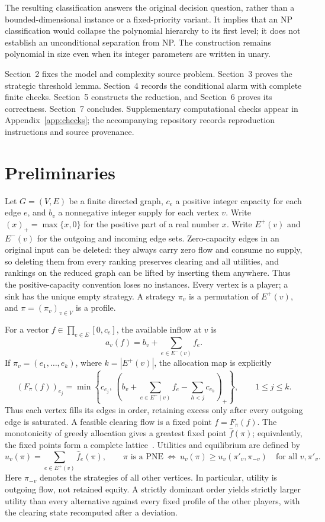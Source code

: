 \documentclass[11pt]{article}
\newcommand{\pne}{\mathrm{PNE}}
\newcommand{\pos}[1]{(#1)_+}
\begin{document}
The resulting classification answers the original decision question, rather than a bounded-dimensional instance or a fixed-priority variant. It implies that an NP classification would collapse the polynomial hierarchy to its first level; it does not establish an unconditional separation from NP. The construction remains polynomial in size even when its integer parameters are written in unary.

Section~2 fixes the model and complexity source problem. Section~3 proves the strategic threshold lemma. Section~4 records the conditional alarm with complete finite checks. Section~5 constructs the reduction, and Section~6 proves its correctness. Section~7 concludes. Supplementary computational checks appear in Appendix~\ref{app:checks}; the accompanying repository records reproduction instructions and source provenance.

\section{Preliminaries}
Let $G=(V,E)$ be a finite directed graph, $c_e$ a positive integer capacity for each edge $e$, and $b_v$ a nonnegative integer supply for each vertex $v$. Write $\pos{x}=\max\{x,0\}$ for the positive part of a real number $x$. Write $E^+(v)$ and $E^-(v)$ for the outgoing and incoming edge sets. Zero-capacity edges in an original input can be deleted: they always carry zero flow and consume no supply, so deleting them from every ranking preserves clearing and all utilities, and rankings on the reduced graph can be lifted by inserting them anywhere. Thus the positive-capacity convention loses no instances. Every vertex is a player; a sink has the unique empty strategy. A strategy $\pi_v$ is a permutation of $E^+(v)$, and $\pi=(\pi_v)_{v\in V}$ is a profile.

For a vector $f\in\prod_{e\in E}[0,c_e]$, the available inflow at $v$ is
\[
 a_v(f)=b_v+\sum_{e\in E^-(v)} f_e.
\]
If $\pi_v=(e_1,\ldots,e_k)$, where $k=|E^+(v)|$, the allocation map is explicitly
\begin{equation}\label{eq:clearing}
 (F_\pi(f))_{e_j}
 =\min\!\left\{c_{e_j},\,
 \left(b_v+\sum_{e\in E^-(v)}f_e-\sum_{h<j}c_{e_h}\right)_+\right\},
 \qquad 1\le j\le k.
\end{equation}
Thus each vertex fills its edges in order, retaining excess only after every outgoing edge is saturated. A feasible clearing flow is a fixed point $f=F_\pi(f)$. The monotonicity of greedy allocation gives a greatest fixed point $\widehat f(\pi)$; equivalently, the fixed points form a complete lattice~\cite[Theorem~1]{bhs}. Utilities and equilibrium are defined by
\begin{equation}\label{eq:pne}
 u_v(\pi)=\sum_{e\in E^+(v)}\widehat f_e(\pi),\qquad
 \pi\text{ is a }\pne\ \Longleftrightarrow\
 u_v(\pi)\ge u_v(\pi'_v,\pi_{-v})\quad\text{for all }v,\pi'_v.
\end{equation}
Here $\pi_{-v}$ denotes the strategies of all other vertices. In particular, utility is outgoing flow, not retained equity. A strictly dominant order yields strictly larger utility than every alternative against every fixed profile of the other players, with the clearing state recomputed after a deviation.
\end{document}
